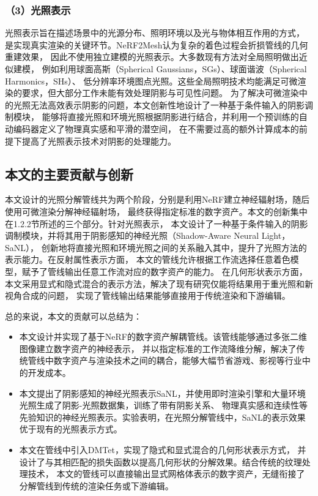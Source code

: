 \subsubsection*{（3）光照表示}

光照表示旨在描述场景中的光源分布、照明环境以及光与物体相互作用的方式，
是实现真实渲染的关键环节。NeRF2Mesh\cite{Tang_2023}认为复杂的着色过程会折损管线的几何重建效果，
因此不使用独立建模的光照表示。大多数现有方法对全局照明做出近似建模，
例如利用球面高斯（Spherical Gaussians，SGs）\cite{Boss_2021, Zhang_2021}、球面谐波（Spherical Harmonics，SHs）\cite{kuang2022neroic}、
低分辨率环境图点光照\cite{zhang2021nerfactor}。这些全局照明技术均能满足可微渲染的要求，但大部分工作未能有效处理阴影与可见性问题。
为了解决可微渲染中的光照无法高效表示阴影的问题，本文创新性地设计了一种基于条件输入的阴影调制模块，
能够将直接光照和环境光照根据阴影进行结合，并利用一个预训练的自动编码器定义了物理真实感和平滑的潜空间，
在不需要过高的额外计算成本的前提下提高了光照表示技术对阴影的处理能力。

\subsection{本文的主要贡献与创新}

本文设计的光照分解管线共为两个阶段，分别是利用NeRF建立神经辐射场，随后使用可微渲染分解神经辐射场，
最终获得指定标准的数字资产。本文的创新集中在1.2.2节所述的三个部分。针对光照表示，
本文设计了一种基于条件输入的阴影调制模块，并将其用于阴影感知的神经光照（Shadow-Aware Neural Light，SaNL），
创新地将直接光照和环境光照之间的关系融入其中，提升了光照方法的表示能力。在反射属性表示方面，
本文的管线允许根据工作流选择任意着色模型，赋予了管线输出任意工作流对应的数字资产的能力。
在几何形状表示方面，本文采用显式和隐式混合的表示方法，解决了现有研究仅能将结果用于重光照和新视角合成的问题，
实现了管线输出结果能够直接用于传统渲染和下游编辑。

总的来说，本文的贡献可以总结为：

\begin{itemize}
  \item 本文设计并实现了基于NeRF的数字资产解耦管线。该管线能够通过多张二维图像建立数字资产的神经表示，
  并以指定标准的工作流降维分解，解决了传统管线中数字资产与渲染技术之间的耦合，能够大幅节省游戏、影视等行业中的开发成本。
  \item 本文提出了阴影感知的神经光照表示SaNL，并使用即时渲染引擎和大量环境光照生成了阴影-光照数据集，训练了带有阴影关系、
  物理真实感和连续性等先验知识的神经光照表示。实验表明，在光照分解管线中，SaNL的表示效果优于现有的光照表示方式。
  \item 本文在管线中引入DMTet，实现了隐式和显式混合的几何形状表示方式，
  并设计了与其相匹配的损失函数以提高几何形状的分解效果。结合传统的纹理处理技术，
  本文的管线可以直接输出显式网格体表示的数字资产，无缝衔接了分解管线到传统的渲染任务或下游编辑。
\end{itemize}

